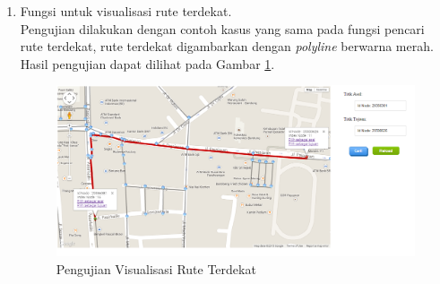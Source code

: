 \begin{enumerate}
  \item Fungsi untuk visualisasi rute terdekat.\\
  Pengujian dilakukan dengan contoh kasus yang sama pada fungsi pencari rute
  terdekat, rute terdekat digambarkan dengan \textit{polyline} berwarna
  merah. Hasil pengujian dapat dilihat pada Gambar \ref{fig:pu_visualrute}.
\begin{figure}[h]
\centering
\includegraphics[scale=0.45]{Gambar/pu_visualrute}
\caption[Pengujian Visualisasi Rute Terdekat]{Pengujian Visualisasi Rute
Terdekat}
\label{fig:pu_visualrute}
\end{figure} 
\end{enumerate}

